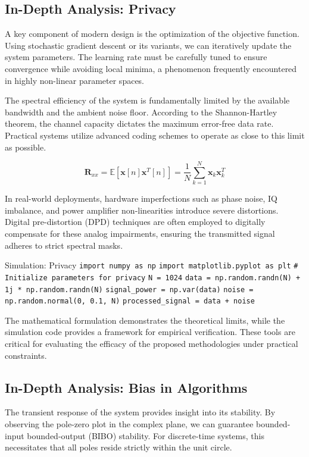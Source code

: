 \subsection{In-Depth Analysis: Privacy}
A key component of modern design is the optimization of the objective function. Using stochastic gradient descent or its variants, we can iteratively update the system parameters. The learning rate must be carefully tuned to ensure convergence while avoiding local minima, a phenomenon frequently encountered in highly non-linear parameter spaces.

The spectral efficiency of the system is fundamentally limited by the available bandwidth and the ambient noise floor. According to the Shannon-Hartley theorem, the channel capacity dictates the maximum error-free data rate. Practical systems utilize advanced coding schemes to operate as close to this limit as possible.

\begin{equation}
    \mathbf{R}_{xx} = \mathbb{E}[\mathbf{x}[n]\mathbf{x}^T[n]] = \frac{1}{N} \sum_{k=1}^{N} \mathbf{x}_k \mathbf{x}_k^T
\end{equation}

In real-world deployments, hardware imperfections such as phase noise, IQ imbalance, and power amplifier non-linearities introduce severe distortions. Digital pre-distortion (DPD) techniques are often employed to digitally compensate for these analog impairments, ensuring the transmitted signal adheres to strict spectral masks.

\begin{pythonbox}{Simulation: Privacy}
\texttt{import numpy as np}
\texttt{import matplotlib.pyplot as plt}
\texttt{}
\texttt{\# Initialize parameters for privacy}
\texttt{N = 1024}
\texttt{data = np.random.randn(N) + 1j * np.random.randn(N)}
\texttt{signal\_power = np.var(data)}
\texttt{noise = np.random.normal(0, 0.1, N)}
\texttt{processed\_signal = data + noise}
\end{pythonbox}

\vspace{0.5cm}
The mathematical formulation demonstrates the theoretical limits, while the simulation code provides a framework for empirical verification. These tools are critical for evaluating the efficacy of the proposed methodologies under practical constraints.


\subsection{In-Depth Analysis: Bias in Algorithms}
The transient response of the system provides insight into its stability. By observing the pole-zero plot in the complex plane, we can guarantee bounded-input bounded-output (BIBO) stability. For discrete-time systems, this necessitates that all poles reside strictly within the unit circle.

